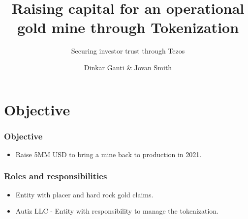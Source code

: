 \documentclass{beamer}
\title{Raising capital for an operational gold mine through Tokenization}
\subtitle{Securing investor trust through Tezos}
\author[Dinkar Ganti \& Jovan Smith] {Dinkar Ganti \& Jovan Smith}
\institute[Autiz LLC]
\begin{document}
\begin{frame}
 \maketitle
\end{frame}


\section{Objective}
\begin{frame}
\frametitle{Objective}
\begin{minipage}{\textwidth}
	\begin{itemize}
    \item  Raise 5MM USD to bring a mine back to production in 2021.
  \end{itemize}

\end{minipage}
\end{frame}

\begin{frame}
\frametitle{Roles and responsibilities}
\begin{minipage}{\textwidth}
  \begin{itemize}
    \item  Entity with placer and hard rock gold claims.
    \item  Autiz LLC - Entity with responsibility to manage the tokenization.
  \end{itemize}
\end{minipage}
\end{frame}
\end{document}
